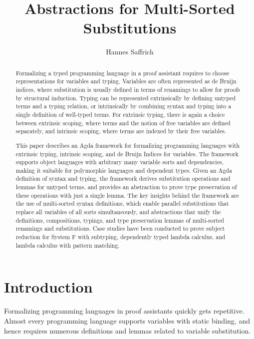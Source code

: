 \documentclass[sigplan,10pt, anonymous]{acmart}
\title{Abstractions for Multi-Sorted Substitutions}
\author{Hannes Saffrich}
\affiliation{
  \institution{University of Freiburg}      %
  \country{Germany}                         %
}
\begin{document}
  \begin{abstract}
    Formalizing a typed programming language in a proof assistant
    requires to choose representations for variables and typing.
    Variables are often represented as de Bruijn indices, where
    substitution is usually defined in terms of renamings to allow for
    proofs by structural induction.
    Typing can be represented extrinsically by defining untyped terms and a typing
    relation, or intrinsically by combining syntax and typing into a single
    definition of well-typed terms.
    For extrinsic typing, there is again a choice between extrinsic
    scoping, where terms and the notion of free variables are defined
    separately, and intrinsic scoping, where terms are indexed by their
    free variables.

    This paper describes an Agda framework for formalizing programming
    languages with extrinsic typing, intrinsic scoping, and de Bruijn
    Indices for variables.
    The framework supports object languages with arbitrary many
    variable sorts and dependencies, making it suitable for
    polymorphic languages and dependent types.
    Given an Agda definition of syntax and typing, the framework derives
    substitution operations and lemmas for untyped terms, and provides an
    abstraction to prove type preservation of these operations with
    just a single lemma.
    The key insights behind the framework are the use of multi-sorted syntax
    definitions, which enable parallel substitutions that replace
    all variables of all sorts simultaneously, and
    abstractions that unify the definitions, compositions, typings,
    and type preservation lemmas of multi-sorted renamings and substitutions.
    Case studies have been conducted to prove subject reduction for
    System F with subtyping, dependently typed lambda calculus, and lambda
    calculus with pattern matching.
  \end{abstract}

  \maketitle

  \section{Introduction}
  \label{sec:introduction}

  Formalizing programming languages in proof assistants quickly gets
  repetitive. Almost every programming language supports variables
  with static binding, and hence requires numerous definitions and
  lemmas related to variable substitution.
\end{document}
